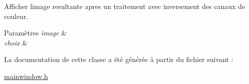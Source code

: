 Afficher l\textquotesingle{}image resultante apres un traitement avec inversement des canaux de couleur. 


\begin{DoxyParams}{Paramètres}
{\em image} & \\
\hline
{\em choix} & \\
\hline
\end{DoxyParams}


La documentation de cette classe a été générée à partir du fichier suivant \+:\begin{DoxyCompactItemize}
\item 
\hyperlink{mainwindow_8h}{mainwindow.\+h}\end{DoxyCompactItemize}
